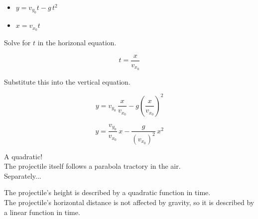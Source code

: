 \documentclass{ximera}
\begin{document}
\begin{itemize}
\item $y = v_{y_0} t - g \, t^2$


\item $x = v_{x_0} t$
\end{itemize}


Solve for $t$ in the horizonal equation.


\[ t = \frac{x}{v_{x_0}} \]

Substitute this into the vertical equation.


\[  y = v_{y_0} \, \frac{x}{v_{x_0}} - g \left(\frac{x}{v_{x_0}}\right)^2  \]



\[  y = \frac{v_{y_0}}{v_{x_0}} \, x  - \frac{g}{(v_{x_0})^2} \, x^2 \]



A quadratic! \\

The projectile itself follows a parabola tractory in the air. \\


Separately...


The projectile's height is described by a quadratic function in time. \\


The projectile's horizontal distance is not affected by gravity, so it is described by a linear function in time. \\
\end{document}
